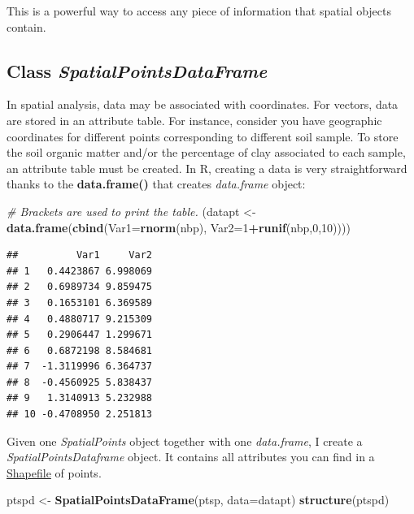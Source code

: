 \documentclass[]{report}
\newenvironment{Shaded}{\begin{snugshade}}{\end{snugshade}}
\newcommand{\CommentTok}[1]{\textcolor[rgb]{0.56,0.35,0.01}{\textit{#1}}}
\newcommand{\DataTypeTok}[1]{\textcolor[rgb]{0.13,0.29,0.53}{#1}}
\newcommand{\DecValTok}[1]{\textcolor[rgb]{0.00,0.00,0.81}{#1}}
\newcommand{\KeywordTok}[1]{\textcolor[rgb]{0.13,0.29,0.53}{\textbf{#1}}}
\newcommand{\NormalTok}[1]{#1}
\newcommand{\OperatorTok}[1]{\textcolor[rgb]{0.81,0.36,0.00}{\textbf{#1}}}
\newcommand{\StringTok}[1]{\textcolor[rgb]{0.31,0.60,0.02}{#1}}
\begin{document}
This is a powerful way to access any piece of information that spatial
objects contain.

\hypertarget{class-spatialpointsdataframe}{%
\subsection{\texorpdfstring{Class
\emph{SpatialPointsDataFrame}}{Class SpatialPointsDataFrame}}\label{class-spatialpointsdataframe}}

In spatial analysis, data may be associated with coordinates. For
vectors, data are stored in an attribute table. For instance, consider
you have geographic coordinates for different points corresponding to
different soil sample. To store the soil organic matter and/or the
percentage of clay associated to each sample, an attribute table must be
created. In R, creating a data is very straightforward thanks to the
\textbf{data.frame()} that creates \emph{data.frame} object:

\begin{Shaded}
\begin{Highlighting}[]
\CommentTok{# Brackets are used to print the table.}
\NormalTok{(datapt <-}\StringTok{ }\KeywordTok{data.frame}\NormalTok{(}\KeywordTok{cbind}\NormalTok{(}\DataTypeTok{Var1=}\KeywordTok{rnorm}\NormalTok{(nbp), }\DataTypeTok{Var2=}\DecValTok{1}\OperatorTok{+}\KeywordTok{runif}\NormalTok{(nbp,}\DecValTok{0}\NormalTok{,}\DecValTok{10}\NormalTok{))))}
\end{Highlighting}
\end{Shaded}

\begin{verbatim}
##          Var1     Var2
## 1   0.4423867 6.998069
## 2   0.6989734 9.859475
## 3   0.1653101 6.369589
## 4   0.4880717 9.215309
## 5   0.2906447 1.299671
## 6   0.6872198 8.584681
## 7  -1.3119996 6.364737
## 8  -0.4560925 5.838437
## 9   1.3140913 5.232988
## 10 -0.4708950 2.251813
\end{verbatim}

Given one \emph{SpatialPoints} object together with one
\emph{data.frame}, I create a \emph{SpatialPointsDataframe} object. It
contains all attributes you can find in a
\href{https://en.wikipedia.org/wiki/Shapefile}{Shapefile} of points.

\begin{Shaded}
\begin{Highlighting}[]
\NormalTok{ptspd <-}\StringTok{ }\KeywordTok{SpatialPointsDataFrame}\NormalTok{(ptsp, }\DataTypeTok{data=}\NormalTok{datapt)}
\KeywordTok{structure}\NormalTok{(ptspd)}
\end{Highlighting}
\end{Shaded}
\end{document}
